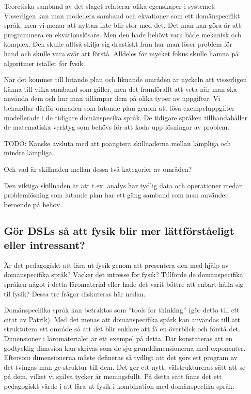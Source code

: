 \begin{binge}
Teoretiska samband av det slaget relaterar olika egenskaper i systemet. Visserligen kan man modellera samband och ekvationer som ett domänspecifikt språk, men vi menar att nyttan inte blir stor med det. Det man kan göra är att programmera en ekvationslösare. Men den hade behövt vara både mekanisk och komplex. Den skulle alltså skilja sig drastiskt från hur man löser problem för hand och skulle vara svår att förstå. Alldeles för mycket fokus skulle hamna på algoritmer istället för fysik.

När det kommer till lutande plan och liknande områden är nyckeln att visserligen känna till vilka samband som gäller, men det framförallt att veta när man ska använda dem och hur man tillämpar dem på olika typer av uppgifter. Vi behandlar därför områden som lutande plan genom att lösa exempeluppgifter modellerade i de tidigare domänspecika språk. De tidigare språken tillhandahåller de matematiska verktyg som behövs för att koda upp lösningar av problem.


TODO: Kanske avsluta med att poängtera skillnaderna mellan lämpliga och mindre lämpliga.

Och vad är skillnaden mellan dessa två kategorier av områden?

Den viktiga skillnaden är att t.ex. analys har tydlig data och operationer
medan problemlösning som lutande plan har ett gäng samband som man använder
beroende på behov.

\subsection{Gör DSLs så att fysik blir mer lättförståeligt eller intressant?}
\label{sec:bara_fysik}

Är det pedagogiskt att lära ut fysik genom att presentera den med hjälp av domänspecifika språk? Väcker det intresse för fysik? Tillförde de domänspecifika språken något i detta läromaterial eller hade det varit bättre att enbart hålla sig til fysik? Dessa tre frågor diskuteras här nedan.

Domänspecifika språk kan betraktas som ''tools for thinking'' (gör detta till ett citat av Patrik). Med det menas att domänspecifika spårk kan användas till att struktutera ett område så att det blir enklare att få en överblick och förstå det. Dimensioner i läromaterialet är ett exempel på detta. Där konstateras att en godtycklig dimesion kan skrivas som de sju grunddimensionerna med exponenter. Eftersom dimensionerna måste defineras så tydligt att det görs ett program av det tvingas man ge struktur till dem. Det ger ett nytt, välstrukturerat sätt att se på dem, vilket vi själva tycker är meningsfullt. På detta sätt finns det ett pedagogiskt värde i att lära ut fysik i kombination med domänspecfika språk.


\end{binge}
